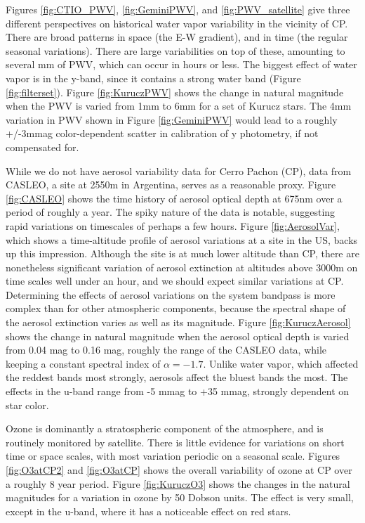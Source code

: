 \documentclass[12pt,preprint]{aastex}
\begin{document}
Figures \ref{fig:CTIO_PWV}, \ref{fig:GeminiPWV}, and \ref{fig:PWV_satellite} give three different perspectives on historical water vapor variability in the vicinity of CP.  There are broad patterns in space (the E-W gradient), and in time (the regular seasonal variations).  There are large variabilities on top of these, amounting to several mm of PWV, which can occur in hours or less.   The biggest effect of water vapor is in the y-band, since it contains a strong water band (Figure \ref{fig:filterset}).   Figure \ref{fig:KuruczPWV} shows the change in natural magnitude when the PWV is varied from 1mm to 6mm for a set of Kurucz stars.  The 4mm variation in PWV shown in Figure \ref{fig:GeminiPWV} would lead to a roughly +/-3mmag color-dependent scatter in calibration of y photometry, if not compensated for. 

While we do not have aerosol variability data for Cerro Pachon (CP), data from CASLEO, a site at 2550m in Argentina, serves as a reasonable proxy.  Figure \ref{fig:CASLEO} shows the time history of aerosol optical depth at 675nm over a period of roughly a year.  The spiky nature of the data is notable, suggesting rapid variations on timescales of perhaps a few hours.  Figure \ref{fig:AerosolVar}, which shows a time-altitude profile of aerosol variations at a site in the US, backs up this impression.  Although the site is at much lower altitude than CP, there are nonetheless significant variation of aerosol extinction at altitudes above 3000m on time scales well under an hour, and we should expect similar variations at CP.  Determining the effects of aerosol variations on the system bandpass is more complex than for other atmospheric components, because the spectral shape of the aerosol extinction varies as well as its magnitude.  Figure \ref{fig:KuruczAerosol} shows the change in natural magnitude when the aerosol optical depth is varied from 0.04 mag to 0.16 mag, roughly the range of the CASLEO data, while keeping a constant spectral index of $\alpha = -1.7$.  Unlike water vapor, which affected the reddest bands most strongly, aerosols affect the bluest bands the most.  The effects in the u-band range from -5 mmag to +35 mmag, strongly dependent on star color.

Ozone is dominantly a stratospheric component of the atmosphere, and is routinely monitored by satellite.   There is little evidence for variations on short time or space scales, with most variation periodic on a seasonal scale.   Figures \ref{fig:O3atCP2} and \ref{fig:O3atCP} shows the overall variability of ozone at CP over a roughly 8 year period.  Figure \ref{fig:KuruczO3} shows the changes in the natural magnitudes for a variation in ozone by 50 Dobson units.   The effect is very small, except in the u-band, where it has a noticeable effect on red stars.
\end{document}
